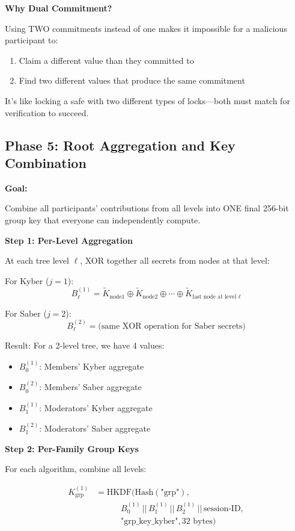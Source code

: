 \documentclass[12pt,a4paper]{report}
\begin{document}
\textbf{Why Dual Commitment?}

Using TWO commitments instead of one makes it impossible for a malicious participant to:
\begin{enumerate}
\item Claim a different value than they committed to
\item Find two different values that produce the same commitment
\end{enumerate}

It's like locking a safe with two different types of locks—both must match for verification to succeed.

\subsection{Phase 5: Root Aggregation and Key Combination}

\textbf{Goal:}

Combine all participants' contributions from all levels into ONE final 256-bit group key that everyone can independently compute.

\textbf{Step 1: Per-Level Aggregation}

At each tree level $\ell$, XOR together all secrets from nodes at that level:

For Kyber ($j=1$):
\[
B_\ell^{(1)} = \widetilde{K}_{\text{node1}} \oplus \widetilde{K}_{\text{node2}} \oplus \cdots \oplus \widetilde{K}_{\text{last node at level } \ell}
\]

For Saber ($j=2$):
\[
B_\ell^{(2)} = \text{(same XOR operation for Saber secrets)}
\]

Result: For a 2-level tree, we have 4 values:
\begin{itemize}
\item $B_0^{(1)}$: Members' Kyber aggregate
\item $B_0^{(2)}$: Members' Saber aggregate
\item $B_1^{(1)}$: Moderators' Kyber aggregate
\item $B_1^{(2)}$: Moderators' Saber aggregate
\end{itemize}

\textbf{Step 2: Per-Family Group Keys}

For each algorithm, combine all levels:

\begin{align*}
K_{\text{grp}}^{(1)} &= \text{HKDF}(\text{Hash}(\text{"grp"}), \\
&\quad\quad\quad B_0^{(1)} \,||\, B_1^{(1)} \,||\, B_2^{(1)} \,||\, \text{session-ID}, \\
&\quad\quad\quad \text{"grp\_key\_kyber"}, 32 \text{ bytes})
\end{align*}
\end{document}
